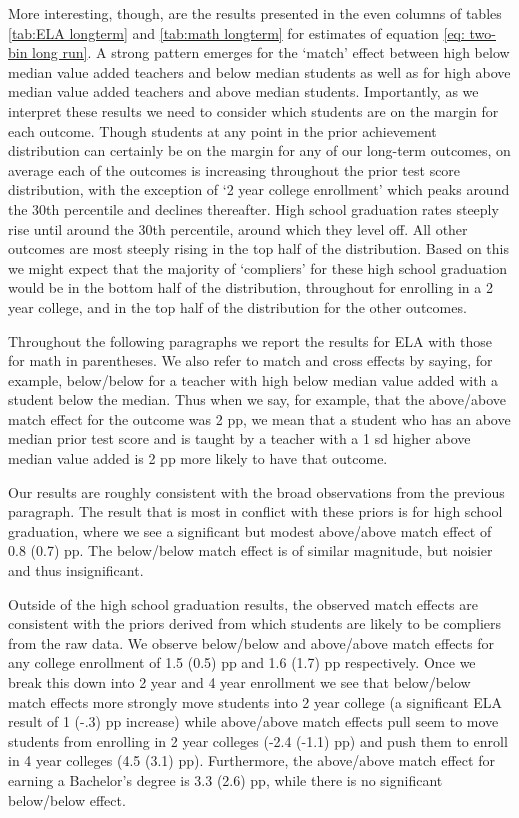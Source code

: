 \documentclass[letterpaper,12pt]{article}
\begin{document}
More interesting, though, are the results presented in the even columns of tables \ref{tab:ELA longterm} and \ref{tab:math longterm} for estimates of equation \ref{eq: two-bin long run}. A strong pattern emerges for the `match' effect between high below median value added teachers and below median students as well as for high above median value added teachers and above median students. Importantly, as we interpret these results we need to consider which students are on the margin for each outcome. Though students at any point in the prior achievement distribution can certainly be on the margin for any of our long-term outcomes, on average each of the outcomes is increasing throughout the prior test score distribution, with the exception of `2 year college enrollment' which peaks around the 30th percentile and declines thereafter. High school graduation rates steeply rise until around the 30th percentile, around which they level off. All other outcomes are most steeply rising in the top half of the distribution. Based on this we might expect that the majority of `compliers' for these high school graduation would be in the bottom half of the distribution, throughout for enrolling in a 2 year college, and in the top half of the distribution for the other outcomes.

Throughout the following paragraphs we report the results for ELA with those for math in parentheses. We also refer to match and cross effects by saying, for example, below/below for a teacher with high below median value added with a student below the median. Thus when we say, for example, that the above/above match effect for the outcome was 2 pp, we mean that a student who has an above median prior test score and is taught by a teacher with a 1 sd higher above median value added is 2 pp more likely to have that outcome. 

Our results are roughly consistent with the broad observations from the previous paragraph. The result that is most in conflict with these priors is for high school graduation, where we see a significant but modest above/above match effect of 0.8 (0.7) pp. The below/below match effect is of similar magnitude, but noisier and thus insignificant.

Outside of the high school graduation results, the observed match effects are consistent with the priors derived from which students are likely to be compliers from the raw data. We observe below/below and above/above match effects for any college enrollment of 1.5 (0.5) pp and 1.6 (1.7) pp respectively. Once we break this down into 2 year and 4 year enrollment we see that below/below match effects more strongly move students into 2 year college (a significant ELA result of 1 (-.3) pp increase) while above/above match effects pull seem to move students from enrolling in 2 year colleges (-2.4 (-1.1) pp) and push them to enroll in 4 year colleges (4.5 (3.1) pp). Furthermore, the above/above match effect for earning a Bachelor's degree is 3.3 (2.6) pp, while there is no significant below/below effect.
\end{document}
